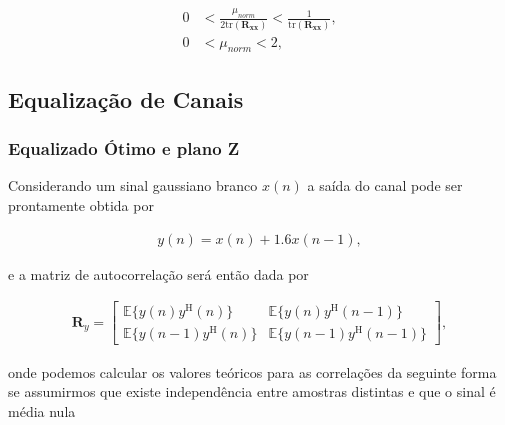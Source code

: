 \begin{align}
    0 &< \frac{\mu_{norm}}{2 \text{tr}(\mathbf{R_{xx}})} < \frac{1}{\text{tr}(\mathbf{R_{xx}})}, \\
    0 &< \mu_{norm} < 2, 
\end{align}
        
\clearpage


\subsection{Equalização de Canais} %


\subsubsection{Equalizado Ótimo e plano Z}
    
Considerando um sinal gaussiano branco $x(n)$ a saída do canal pode ser prontamente obtida por

\begin{align}
    y(n) = x(n) + 1.6 x(n - 1),
\end{align}

e a matriz de autocorrelação será então dada por

\begin{align}
    \mathbf{R}_{y} =
    \begin{bmatrix}
        \mathbb{E}\{y(n)y^{\text{H}}(n)\} & \mathbb{E}\{y(n)y^{\text{H}}(n - 1)\} \\
        \mathbb{E}\{y(n - 1)y^{\text{H}}(n)\} & \mathbb{E}\{y(n - 1)y^{\text{H}}(n - 1)\}
    \end{bmatrix},
\end{align}

onde podemos calcular os valores teóricos para as correlações da seguinte forma se assumirmos que existe independência entre amostras distintas e que o sinal é média nula 

